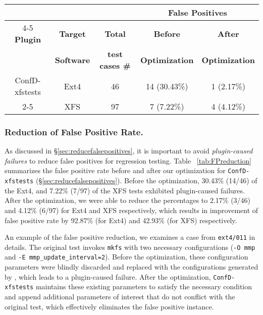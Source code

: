 \begin{table*}[t]
	\small
	\begin{center}
		\begin{tabular}{ c | c | c | c | c }
         & & & \multicolumn{2}{c}{\textbf{False Positives}} \\
                    \cline{4-5}
 	\textbf{Plugin}  & \textbf{Target}  & \textbf{Total} & \textbf{Before } & \textbf{After}     \\
        \textbf{ }  & \textbf{Software}  & \textbf{test cases \#} & \textbf{Optimization} & \textbf{Optimization}     \\
          \hline
ConfD-xfstests   & Ext4   & 46 & 14 (30.43\%) & 1 (2.17\%)\\
			\cline{2-5}
 & XFS  & 97 &  7 (7.22\%) & 4 (4.12\%) \\
	\hline
		\end{tabular}
	\end{center}

	\caption{ {\bf Summary of False Positive Reduction.}  This table summarizes the number of false positives before and after our optimization to the testing script. 
}
	\label{tab:FPreduction}
\end{table*}

\vspace{-0.05in}
\subsubsection{Reduction of False Positive Rate.}
\label{sec:FalsePositiveExp}
As discussed in \S\ref{sec:reducefalsepositives}, it is important to avoid \textit{plugin-caused failures} to reduce false positives for regression testing. 
 Table ~\ref{tab:FPreduction} summarizes the false positive rate before and after our optimization for \texttt{ConfD-xfstests} (\S\ref{sec:reducefalsepositives}). 
Before the optimization,  
30.43\% (14/46) of the Ext4, and 7.22\% (7/97) of the XFS tests exhibited plugin-caused failures.
 After the optimization, we were able to reduce the percentages to 2.17\% (3/46) and 4.12\% (6/97) for Ext4 and XFS respectively,  which results in improvement of false positive rate by 92.87\% (for Ext4) and 42.93\% (for XFS) respectively. 

An example of the false positive reduction,  we examines a case from \texttt{ext4/011} in details. The original test invokes \texttt{mkfs} with two necessary configurations (\texttt{-O mmp} and \texttt{-E mmp\_update\_interval=2}). Before the optimization, these configuration parameters were blindly discarded and  replaced with the configurations generated by \prj, which leads to a plugin-caused failure. After the optimization, \texttt{ConfD-xfstests} maintains these existing parameters to satisfy the necessary condition and append additional parameters of interest that do not conflict with the original test, which effectively eliminates the false positive instance.  


